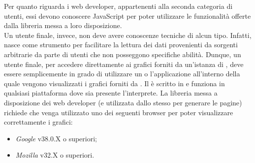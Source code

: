 		Per quanto riguarda i web developer, appartenenti alla seconda categoria di utenti, essi devono conoscere JavaScript per poter utilizzare le funzionalità offerte dalla libreria messa a loro disposizione.\\
		Un utente finale, invece, non deve avere conoscenze tecniche di alcun tipo. Infatti,  nasce come strumento per facilitare la lettura dei dati provenienti da sorgenti arbitrarie da parte di utenti che non posseggono specifiche abilità. Dunque, un utente finale, per accedere direttamente ai grafici forniti da un'istanza di , deve essere semplicemente in grado di utilizzare un  o l'applicazione all'interno della quale vengono visualizzati i grafici forniti da .
		Il  è scritto in  e funziona in qualsiasi piattaforma dove sia presente l'interprete.
		La libreria messa a disposizione dei web developer (e utilizzata dallo stesso  per generare le pagine) richiede che venga utilizzato uno dei seguenti browser per poter visualizzare correttamente i grafici:
		\begin{itemize}
			\item \emph{Google } v38.0.X o superiori;
			\item \emph{Mozilla } v32.X o superiori.
		\end{itemize}
